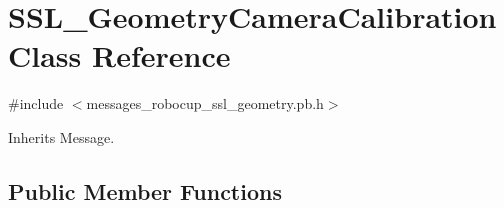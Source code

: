 \hypertarget{class_s_s_l___geometry_camera_calibration}{\section{S\-S\-L\-\_\-\-Geometry\-Camera\-Calibration Class Reference}
\label{class_s_s_l___geometry_camera_calibration}
}


{\ttfamily \#include $<$messages\-\_\-robocup\-\_\-ssl\-\_\-geometry.\-pb.\-h$>$}



Inherits Message.

\subsection*{Public Member Functions}
